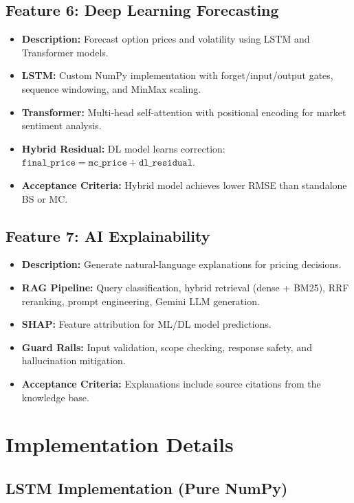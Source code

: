 \documentclass[12pt,a4paper]{report}
\begin{document}
\subsection{Feature 6: Deep Learning Forecasting}

\begin{itemize}
    \item \textbf{Description:} Forecast option prices and volatility using LSTM and Transformer models.
    \item \textbf{LSTM:} Custom NumPy implementation with forget/input/output gates, sequence windowing, and MinMax scaling.
    \item \textbf{Transformer:} Multi-head self-attention with positional encoding for market sentiment analysis.
    \item \textbf{Hybrid Residual:} DL model learns correction: $\texttt{final\_price} = \texttt{mc\_price} + \texttt{dl\_residual}$.
    \item \textbf{Acceptance Criteria:} Hybrid model achieves lower RMSE than standalone BS or MC.
\end{itemize}

\subsection{Feature 7: AI Explainability}

\begin{itemize}
    \item \textbf{Description:} Generate natural-language explanations for pricing decisions.
    \item \textbf{RAG Pipeline:} Query classification, hybrid retrieval (dense + BM25), RRF reranking, prompt engineering, Gemini LLM generation.
    \item \textbf{SHAP:} Feature attribution for ML/DL model predictions.
    \item \textbf{Guard Rails:} Input validation, scope checking, response safety, and hallucination mitigation.
    \item \textbf{Acceptance Criteria:} Explanations include source citations from the knowledge base.
\end{itemize}

\section{Implementation Details}

\subsection{LSTM Implementation (Pure NumPy)}
\end{document}
